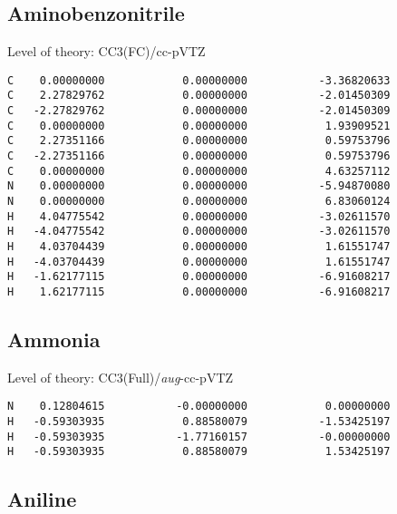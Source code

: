 \documentclass[journal=jctcce,manuscript=article,layout=traditional]{achemso}
\newcommand{\TZ}{cc-pVTZ}
\newcommand{\AVTZ}{\emph{aug}-cc-pVTZ}
\begin{document}
\subsection*{Aminobenzonitrile}

\begin{singlespace}
Level of theory: CC3(FC)/{\TZ}
\begin{verbatim}
C    0.00000000            0.00000000           -3.36820633
C    2.27829762            0.00000000           -2.01450309
C   -2.27829762            0.00000000           -2.01450309
C    0.00000000            0.00000000            1.93909521
C    2.27351166            0.00000000            0.59753796
C   -2.27351166            0.00000000            0.59753796
C    0.00000000            0.00000000            4.63257112
N    0.00000000            0.00000000           -5.94870080
N    0.00000000            0.00000000            6.83060124
H    4.04775542            0.00000000           -3.02611570
H   -4.04775542            0.00000000           -3.02611570
H    4.03704439            0.00000000            1.61551747
H   -4.03704439            0.00000000            1.61551747
H   -1.62177115            0.00000000           -6.91608217
H    1.62177115            0.00000000           -6.91608217
\end{verbatim}
\end{singlespace}

\subsection*{Ammonia}

\begin{singlespace}
Level of theory: CC3(Full)/{\AVTZ}
\begin{verbatim}
N    0.12804615           -0.00000000            0.00000000
H   -0.59303935            0.88580079           -1.53425197
H   -0.59303935           -1.77160157           -0.00000000
H   -0.59303935            0.88580079            1.53425197  
\end{verbatim}
\end{singlespace}

\subsection*{Aniline}
\end{document}
